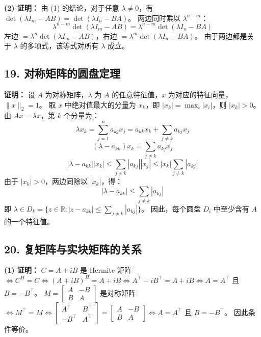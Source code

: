 \documentclass{article}
\begin{document}
\textbf{(2) 证明：}
由 (1) 的结论，对于任意 \(\lambda \neq 0\)，有 \(\det(\lambda I_m - AB) = \det(\lambda I_n - BA)\)。
两边同时乘以 \(\lambda^{n-m}\)：
\[
 \lambda^{n-m} \det(\lambda I_m - AB) = \lambda^{n-m} \det(\lambda I_n - BA) 
\]
左边 \(= \lambda^n \det(\lambda I_m - AB)\)，右边 \(= \lambda^m \det(\lambda I_n - BA)\)。
由于两边都是关于 \(\lambda\) 的多项式，该等式对所有 \(\lambda\) 成立。

\subsection*{19. 对称矩阵的圆盘定理}
\textbf{证明：}
设 \(A\) 为对称矩阵，\(\lambda\) 为 \(A\) 的任意特征值，\(x\) 为对应的特征向量，\(\|x\|_2 = 1\)。
取 \(x\) 中绝对值最大的分量为 \(x_k\)，即 \(|x_k| = \max_i |x_i|\)，则 \(|x_k| > 0\)。
由 \(Ax = \lambda x\)，第 \(k\) 个分量为：
\[
 \lambda x_k = \sum_{j=1}^n a_{kj} x_j = a_{kk} x_k + \sum_{j \neq k} a_{kj} x_j 
\]
\[
 (\lambda - a_{kk}) x_k = \sum_{j \neq k} a_{kj} x_j 
\]
\[
 |\lambda - a_{kk}| |x_k| \le \sum_{j \neq k} |a_{kj}| |x_j| \le |x_k| \sum_{j \neq k} |a_{kj}| 
\]
由于 \(|x_k| > 0\)，两边同除以 \(|x_k|\)，得：
\[
 |\lambda - a_{kk}| \le \sum_{j \neq k} |a_{kj}| 
\]
即 \(\lambda \in D_k = \{ z \in \mathbb{R} : |z - a_{kk}| \le \sum_{j \neq k} |a_{kj}| \}\)。
因此，每个圆盘 \(D_i\) 中至少含有 \(A\) 的一个特征值。

\subsection*{20. 复矩阵与实块矩阵的关系}
\textbf{(1) 证明：}
\(C = A + iB\) 是 Hermite 矩阵 \(\iff C^H = C \iff (A + iB)^H = A + iB \iff A^\top - iB^\top = A + iB \iff A = A^\top\) 且 \(B = -B^\top\)。
\(M = \begin{bmatrix} A & -B \\ B & A \end{bmatrix}\) 是对称矩阵 \(\iff M^\top = M \iff \begin{bmatrix} A^\top & B^\top \\ -B^\top & A^\top \end{bmatrix} = \begin{bmatrix} A & -B \\ B & A \end{bmatrix} \iff A = A^\top\) 且 \(B = -B^\top\)。
因此条件等价。
\end{document}
